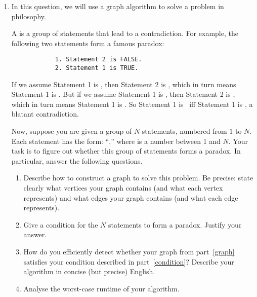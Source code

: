 \documentclass[11pt,twoside]{article}
\begin{document}
\begin{enumerate}[leftmargin=0pt]




\item
	In this question, we will use a graph algorithm to solve a problem
	in philosophy. 
	
	A  is a group of statements that lead to a contradiction.
	For example, the following two statements form a famous paradox:
	\begin{verbatim}
		    1. Statement 2 is FALSE.
		    2. Statement 1 is TRUE.
	\end{verbatim}
	If we assume Statement 1 is \True, then Statement 2 is \False, which
	in turn means Statement 1 is \False. But if we assume Statement 1 is
	\False, then Statement 2 is \True, which in turn means Statement 1
	is \True. So Statement 1 is \True\ iff Statement 1 is \False, a blatant
	contradiction.

	Now, suppose you are given a group of $N$ statements, numbered from $1$
	to $N$. Each statement has the form: ``,'' where  is a number between 1 and $N$. Your
	task is to figure out whether this group of statements forms a paradox.
	In particular, answer the following questions.
	\begin{enumerate}[label=(\alph*),topsep=\parsep]

	\item\label{graph}%
		Describe how to construct a graph to solve this problem. Be
		precise: state clearly what vertices your graph contains (and what
		each vertex represents) and what edges your graph contains (and what
		each edge represents).

	\item\label{condition}%
		Give a  condition for the $N$
		statements to form a paradox. Justify your answer.

	\item  How do you efficiently detect whether your graph from
		part~\ref{graph} satisfies your condition described in
		part~\ref{condition}? Describe your algorithm in concise (but
		precise) English.

	\item  Analyse the worst-case runtime of your algorithm.


\end{enumerate}
\end{enumerate}
\end{document}
